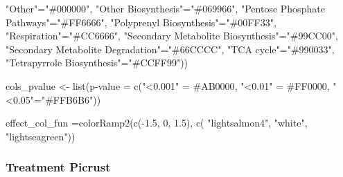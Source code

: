 \documentclass[]{interact}
\theoremstyle{plain}%
\theoremstyle{definition}
\theoremstyle{remark}
\newenvironment{Shaded}{\begin{snugshade}}{\end{snugshade}}
\newcommand{\DecValTok}[1]{\textcolor[rgb]{0.00,0.00,0.81}{#1}}
\newcommand{\FloatTok}[1]{\textcolor[rgb]{0.00,0.00,0.81}{#1}}
\newcommand{\FunctionTok}[1]{\textcolor[rgb]{0.00,0.00,0.00}{#1}}
\newcommand{\NormalTok}[1]{#1}
\newcommand{\OtherTok}[1]{\textcolor[rgb]{0.56,0.35,0.01}{#1}}
\newcommand{\SpecialCharTok}[1]{\textcolor[rgb]{0.00,0.00,0.00}{#1}}
\newcommand{\StringTok}[1]{\textcolor[rgb]{0.31,0.60,0.02}{#1}}
\begin{document}
\begin{Shaded}
\begin{Highlighting}[]
  \StringTok{"Other"}\OtherTok{=}\StringTok{"\#000000"}\NormalTok{,}
  \StringTok{"Other Biosynthesis"}\OtherTok{=}\StringTok{"\#069966"}\NormalTok{,}
  \StringTok{"Pentose Phosphate Pathways"}\OtherTok{=}\StringTok{"\#FF6666"}\NormalTok{,}
  \StringTok{"Polyprenyl Biosynthesis"}\OtherTok{=}\StringTok{"\#00FF33"}\NormalTok{,}
  \StringTok{"Respiration"}\OtherTok{=}\StringTok{"\#CC6666"}\NormalTok{,}
  \StringTok{"Secondary Metabolite Biosynthesis"}\OtherTok{=}\StringTok{"\#99CC00"}\NormalTok{,}
  \StringTok{"Secondary Metabolite Degradation"}\OtherTok{=}\StringTok{"\#66CCCC"}\NormalTok{,}
  \StringTok{"TCA cycle"}\OtherTok{=}\StringTok{"\#990033"}\NormalTok{,}
  \StringTok{"Tetrapyrrole Biosynthesis"}\OtherTok{=}\StringTok{"\#CCFF99"}\NormalTok{))}

\NormalTok{cols\_pvalue }\OtherTok{\textless{}{-}} \FunctionTok{list}\NormalTok{(}\StringTok{\textquotesingle{}p{-}value\textquotesingle{}} \OtherTok{=} \FunctionTok{c}\NormalTok{(}\StringTok{"\textless{}0.001"} \OtherTok{=} \StringTok{\textquotesingle{}\#AB0000\textquotesingle{}}\NormalTok{,}
                                  \StringTok{"\textless{}0.01"} \OtherTok{=} \StringTok{\textquotesingle{}\#FF0000\textquotesingle{}}\NormalTok{,}
                                  \StringTok{"\textless{}0.05"}\OtherTok{=}\StringTok{"\#FFB6B6"}\NormalTok{))}

\NormalTok{effect\_col\_fun }\OtherTok{=}\FunctionTok{colorRamp2}\NormalTok{(}\FunctionTok{c}\NormalTok{(}\SpecialCharTok{{-}}\FloatTok{1.5}\NormalTok{, }\DecValTok{0}\NormalTok{, }\FloatTok{1.5}\NormalTok{), }\FunctionTok{c}\NormalTok{(}
  \StringTok{"lightsalmon4"}\NormalTok{, }\StringTok{"white"}\NormalTok{, }\StringTok{"lightseagreen"}\NormalTok{))}
\end{Highlighting}
\end{Shaded}

\hypertarget{treatment-picrust}{%
\subsubsection{Treatment Picrust}\label{treatment-picrust}}
\end{document}
